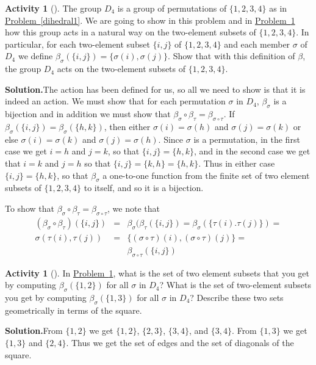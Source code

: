 \documentclass[10pt,]{book}
\theoremstyle{plain}
\theoremstyle{definition}
\newtheorem{activity}[project]{Activity}
\numberwithin{equation}{chapter}
\newcommand{\amp}{&}
\begin{document}
\begin{activity}[]\label{D_4on2-sets}
The group \(D_4\) is a group of permutations of \(\{1,2,3,4\}\) as in \hyperref[dihedral1]{Problem~\ref{dihedral1}}. We are going to show in this problem and in \hyperref[orbits1]{Problem~\ref{orbits1}} how this group acts in a natural way on the two-element subsets of \(\{1,2,3,4\}\). In particular, for each two-element subset \(\{i,j\}\) of \(\{1,2,3,4\}\) and each member \(\sigma\) of \(D_4\) we define \(\beta_{\sigma}(\{i,j\}) = \{\sigma(i),\sigma(j)\}\). Show that with this definition of \(\beta\), the group \(D_4\) acts on the two-element subsets of \(\{1,2,3,4\}\).%
\par\medskip\noindent%
\textbf{Solution.}\quad The action has been defined for us, so all we need to show is that it is indeed an action. We must show that for each permutation \(\sigma\) in \(D_4\), \(\beta_{\sigma}\) is a bijection and in addition we must show that \(\beta_{\sigma}\circ\beta_{\tau}=
\beta_{\sigma\circ\tau}\). If \(\beta_{\sigma}(\{i,j\})=\beta_{\sigma}(\{h,k\})\), then either \(\sigma(i)=\sigma(h)\) and \(\sigma(j)=\sigma(k)\) or else \(\sigma(i)=\sigma(k)\) and \(\sigma(j) =\sigma(h)\). Since \(\sigma\) is a permutation, in the first case we get \(i=h\) and \(j=k\), so that \(\{i,j\}=
\{h,k\}\), and in the second case we get that \(i=k\) and \(j=h\) so that \(\{i,j\} = \{k,h\} =\{h,k\}\). Thus in either case \(\{i,j\} = \{h,k\}\), so that \(\beta_{\sigma}\) a one-to-one function from the finite set of two element subsets of \(\{1,2,3,4\}\) to itself, and so it is a bijection.%
\par
To show that \(\beta_{\sigma}\circ\beta_{\tau} = \beta_{\sigma\circ\tau}\), we note that%
\begin{align*}
(\beta_{\sigma}\circ\beta_{\tau})(\{i,j\}) \amp =\amp
\beta_{\sigma}(\beta_{\tau}(\{i,j\})=\beta_{\sigma}(\{\tau(i).
\tau(j)\})=\\
\sigma({\tau(i),\tau(j)})\amp =\amp \{(\sigma\circ\tau)(i),(\sigma\circ\tau)(j)\} =\\
\amp \amp \beta_{\sigma\circ\tau}(\{i,j\})
\end{align*}
%
\end{activity}
\begin{activity}[]\label{orbits1}
In \hyperref[D_4on2-sets]{Problem~\ref{D_4on2-sets}}, what is the set of two element subsets that you get by computing \(\beta_{\sigma}(\{1,2\})\) for all \(\sigma\) in \(D_4\)? What is the set of two-element subsets you get by computing \(\beta_{\sigma}(\{1,3\})\) for all \(\sigma\) in \(D_4\)? Describe these two sets geometrically in terms of the square.%
\par\medskip\noindent%
\textbf{Solution.}\quad From \(\{1,2\}\) we get \(\{1,2\}\), \(\{2,3\}\), \(\{3,4\}\), and \(\{3,4\}\). From \(\{1,3\}\) we get \(\{1,3\}\) and \(\{2,4\}\). Thus we get the set of edges and the set of diagonals of the square.%
\end{activity}
\end{document}
